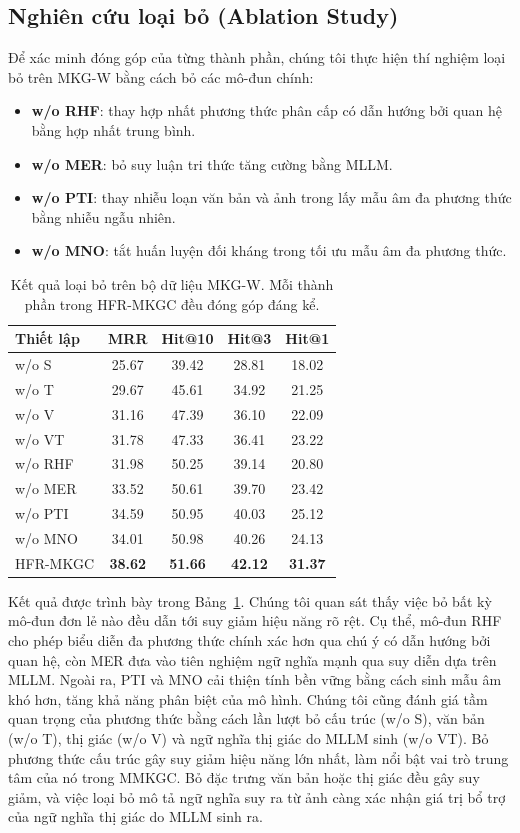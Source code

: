 \documentclass[10pt,twocolumn,a4paper]{article}
\begin{document}
\subsection{Nghiên cứu loại bỏ (Ablation Study)}

Để xác minh đóng góp của từng thành phần, chúng tôi thực hiện thí nghiệm loại bỏ trên MKG-W bằng cách bỏ các mô-đun chính:
\begin{itemize}
\item \textbf{w/o RHF}: thay hợp nhất phương thức phân cấp có dẫn hướng bởi quan hệ bằng hợp nhất trung bình.
\item \textbf{w/o MER}: bỏ suy luận tri thức tăng cường bằng MLLM.
\item \textbf{w/o PTI}: thay nhiễu loạn văn bản và ảnh trong lấy mẫu âm đa phương thức bằng nhiễu ngẫu nhiên.
\item \textbf{w/o MNO}: tắt huấn luyện đối kháng trong tối ưu mẫu âm đa phương thức.
\end{itemize}

\begin{table}[t]
\centering
\small
\begin{tabular}{l cccc}
\toprule
Thiết lập & MRR & Hit@10 & Hit@3 & Hit@1\\
\midrule
w/o S & 25.67 & 39.42 & 28.81 & 18.02\\
w/o T & 29.67 & 45.61 & 34.92 & 21.25\\
w/o V & 31.16 & 47.39 & 36.10 & 22.09\\
w/o VT & 31.78 & 47.33 & 36.41 & 23.22\\
w/o RHF & 31.98 & 50.25 & 39.14 & 20.80\\
w/o MER & 33.52 & 50.61 & 39.70 & 23.42\\
w/o PTI & 34.59 & 50.95 & 40.03 & 25.12\\
w/o MNO & 34.01 & 50.98 & 40.26 & 24.13\\
\midrule
HFR-MKGC & \textbf{38.62} & \textbf{51.66} & \textbf{42.12} & \textbf{31.37}\\
\bottomrule
\end{tabular}
\caption{Kết quả loại bỏ trên bộ dữ liệu MKG-W. Mỗi thành phần trong HFR-MKGC đều đóng góp đáng kể.}
\label{tab:ablation}
\end{table}

Kết quả được trình bày trong Bảng~\ref{tab:ablation}. Chúng tôi quan sát thấy việc bỏ bất kỳ mô-đun đơn lẻ nào đều dẫn tới suy giảm hiệu năng rõ rệt. Cụ thể, mô-đun RHF cho phép biểu diễn đa phương thức chính xác hơn qua chú ý có dẫn hướng bởi quan hệ, còn MER đưa vào tiên nghiệm ngữ nghĩa mạnh qua suy diễn dựa trên MLLM. Ngoài ra, PTI và MNO cải thiện tính bền vững bằng cách sinh mẫu âm khó hơn, tăng khả năng phân biệt của mô hình. Chúng tôi cũng đánh giá tầm quan trọng của phương thức bằng cách lần lượt bỏ cấu trúc (w/o S), văn bản (w/o T), thị giác (w/o V) và ngữ nghĩa thị giác do MLLM sinh (w/o VT). Bỏ phương thức cấu trúc gây suy giảm hiệu năng lớn nhất, làm nổi bật vai trò trung tâm của nó trong MMKGC. Bỏ đặc trưng văn bản hoặc thị giác đều gây suy giảm, và việc loại bỏ mô tả ngữ nghĩa suy ra từ ảnh càng xác nhận giá trị bổ trợ của ngữ nghĩa thị giác do MLLM sinh ra.
\end{document}
